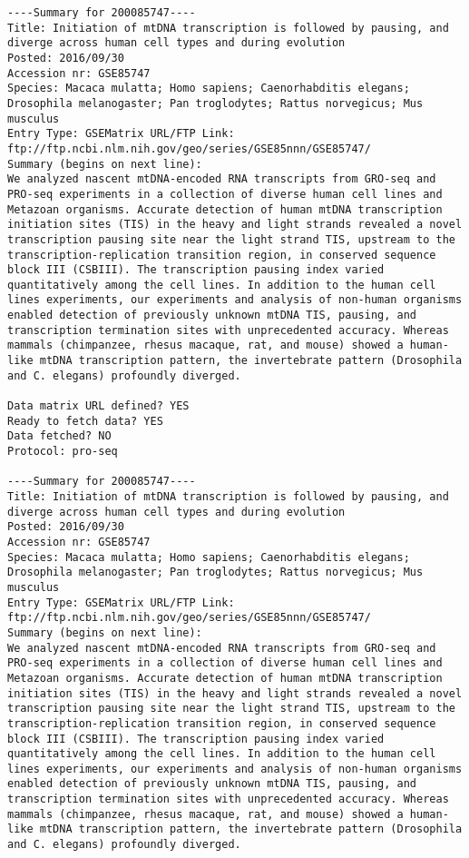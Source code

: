 \documentclass[12pt,letterpaper]{article}
\begin{document}
\begin{verbatim}
----Summary for 200085747----
Title: Initiation of mtDNA transcription is followed by pausing, and diverge across human cell types and during evolution
Posted: 2016/09/30
Accession nr: GSE85747
Species: Macaca mulatta; Homo sapiens; Caenorhabditis elegans; Drosophila melanogaster; Pan troglodytes; Rattus norvegicus; Mus musculus
Entry Type: GSEMatrix URL/FTP Link: ftp://ftp.ncbi.nlm.nih.gov/geo/series/GSE85nnn/GSE85747/
Summary (begins on next line):
We analyzed nascent mtDNA-encoded RNA transcripts from GRO-seq and PRO-seq experiments in a collection of diverse human cell lines and Metazoan organisms. Accurate detection of human mtDNA transcription initiation sites (TIS) in the heavy and light strands revealed a novel transcription pausing site near the light strand TIS, upstream to the transcription-replication transition region, in conserved sequence block III (CSBIII). The transcription pausing index varied quantitatively among the cell lines. In addition to the human cell lines experiments, our experiments and analysis of non-human organisms enabled detection of previously unknown mtDNA TIS, pausing, and transcription termination sites with unprecedented accuracy. Whereas mammals (chimpanzee, rhesus macaque, rat, and mouse) showed a human-like mtDNA transcription pattern, the invertebrate pattern (Drosophila and C. elegans) profoundly diverged.

Data matrix URL defined? YES
Ready to fetch data? YES
Data fetched? NO
Protocol: pro-seq

----Summary for 200085747----
Title: Initiation of mtDNA transcription is followed by pausing, and diverge across human cell types and during evolution
Posted: 2016/09/30
Accession nr: GSE85747
Species: Macaca mulatta; Homo sapiens; Caenorhabditis elegans; Drosophila melanogaster; Pan troglodytes; Rattus norvegicus; Mus musculus
Entry Type: GSEMatrix URL/FTP Link: ftp://ftp.ncbi.nlm.nih.gov/geo/series/GSE85nnn/GSE85747/
Summary (begins on next line):
We analyzed nascent mtDNA-encoded RNA transcripts from GRO-seq and PRO-seq experiments in a collection of diverse human cell lines and Metazoan organisms. Accurate detection of human mtDNA transcription initiation sites (TIS) in the heavy and light strands revealed a novel transcription pausing site near the light strand TIS, upstream to the transcription-replication transition region, in conserved sequence block III (CSBIII). The transcription pausing index varied quantitatively among the cell lines. In addition to the human cell lines experiments, our experiments and analysis of non-human organisms enabled detection of previously unknown mtDNA TIS, pausing, and transcription termination sites with unprecedented accuracy. Whereas mammals (chimpanzee, rhesus macaque, rat, and mouse) showed a human-like mtDNA transcription pattern, the invertebrate pattern (Drosophila and C. elegans) profoundly diverged.


\end{verbatim}
\end{document}
